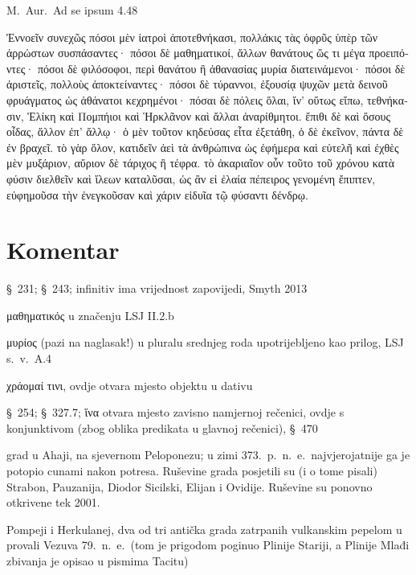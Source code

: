 M.~Aur.\ Ad se ipsum 4.48


\medskip


{\large

\begin{greek}

\noindent  Ἐννοεῖν συνεχῶς πόσοι μὲν ἰατροὶ ἀποτεθνήκασι, πολλάκις τὰς ὀφρῦς ὑπὲρ τῶν ἀρρώστων συσπάσαντες· πόσοι δὲ μαθηματικοί, ἄλλων θανάτους ὥς τι μέγα προειπόντες· πόσοι δὲ φιλόσοφοι, περὶ θανάτου ἢ ἀθανασίας μυρία διατεινάμενοι· πόσοι δὲ ἀριστεῖς, πολλοὺς ἀποκτείναντες· πόσοι δὲ τύραννοι, ἐξουσίᾳ ψυχῶν μετὰ δεινοῦ φρυάγματος ὡς ἀθάνατοι κεχρημένοι· πόσαι δὲ πόλεις ὅλαι, ἵν' οὕτως εἴπω, τεθνήκασιν, Ἑλίκη καὶ Πομπήιοι καὶ Ἡρκλᾶνον καὶ ἄλλαι ἀναρίθμητοι. ἔπιθι δὲ καὶ ὅσους οἶδας, ἄλλον ἐπ' ἄλλῳ· ὁ μὲν τοῦτον κηδεύσας εἶτα ἐξετάθη, ὁ δὲ ἐκεῖνον, πάντα δὲ ἐν βραχεῖ. τὸ γὰρ ὅλον, κατιδεῖν ἀεὶ τὰ ἀνθρώπινα ὡς ἐφήμερα καὶ εὐτελῆ καὶ ἐχθὲς μὲν μυξάριον, αὔριον δὲ τάριχος ἢ τέφρα. τὸ ἀκαριαῖον οὖν τοῦτο τοῦ χρόνου κατὰ φύσιν διελθεῖν καὶ ἵλεων καταλῦσαι, ὡς ἂν εἰ ἐλαία πέπειρος γενομένη ἔπιπτεν, εὐφημοῦσα τὴν ἐνεγκοῦσαν καὶ χάριν εἰδυῖα τῷ φύσαντι δένδρῳ.


\end{greek}

}


\section*{Komentar}


\begin{description}[noitemsep]
\item[Ἐννοεῖν]  §~231; §~243; infinitiv ima vrijednost zapovijedi, Smyth 2013
\item[μαθηματικοί] μαθηματικός u značenju LSJ II.2.b
\item[μυρία] μυρίος (pazi na naglasak!) u pluralu srednjeg roda upotrijebljeno kao prilog, LSJ s.~v.\ A.4
\item[κεχρημένοι] χράομαί τινι, ovdje otvara mjesto objektu u dativu
\item[ἵν'\dots\ εἴπω] §~254; §~327.7; ἵνα otvara mjesto zavisno namjernoj rečenici, ovdje s konjunktivom (zbog oblika predikata u glavnoj rečenici), §~470
\item[Ἑλίκη] grad u Ahaji, na sjevernom Peloponezu; u zimi 373.\ p.~n.~e.\ najvjerojatnije ga je potopio cunami nakon potresa. Ruševine grada posjetili su (i o tome pisali) Strabon, Pauzanija, Diodor Sicilski, Elijan i Ovidije. Ruševine su ponovno otkrivene tek 2001.
\item[Πομπήιοι καὶ Ἡρκλᾶνον] Pompeji i Herkulanej, dva od tri antička grada zatrpanih vulkanskim pepelom u provali Vezuva 79.\ n.~e.\ (tom je prigodom poginuo Plinije Stariji, a Plinije Mlađi zbivanja je opisao u pismima Tacitu)
\end{description}


